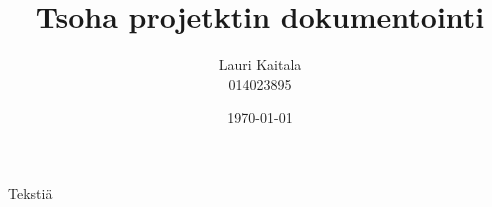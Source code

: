\documentclass[12pt]{article}
\author{Lauri Kaitala \\ 014023895}
\title{\textbf{Tsoha projetktin dokumentointi}}
\date{\today}
\begin{document}
\maketitle

Tekstiä
\end{document}
